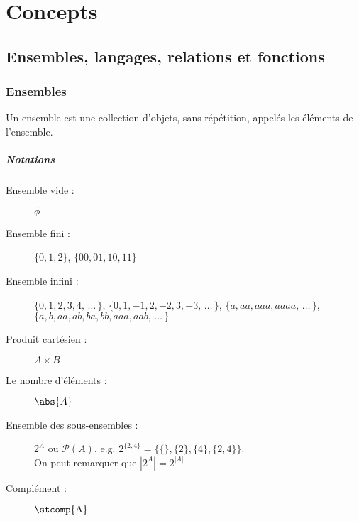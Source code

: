 
\chapter{Concepts}
\label{ch:concepts}

\section{Ensembles, langages, relations et fonctions}
\label{sec:ensembles_langages_relations_et_fonctions}

\subsection{Ensembles}
\label{subsec:ensembles}
Un ensemble est une collection d'objets, sans répétition, appelés les éléments
de l'ensemble.
\paragraph{Notations}

\begin{description}
	\item [Ensemble vide :] $\phi$
	\item [Ensemble fini :] $\{ 0, 1, 2\}$, $\{00, 01, 10, 11\}$
	\item [Ensemble infini :] $\{ 0, 1, 2, 3, 4,\, \ldots\,\}$, $\{0, 1, -1, 2, -2, 3, -3, \, \ldots\,\}$, 
	\subitem $\{a, aa, aaa, aaaa,\, \ldots\,\}$, $\{a, b, aa, ab, ba, bb, aaa, aab, \, \ldots\,\}$
	\item [Produit cartésien :] $A \times B$
    \item [Le nombre d'éléments :] $\abs{A}$
    \item [Ensemble des sous-ensembles :] $2^A$ ou $\mathcal{P}(A)$, e.g. $2^{\{2,4\}} = \{\{\}, \{2\}, \{4\}, \{2,4\}\}$. \\
      On peut remarquer que $|2^A| = 2^{|A|}$
	\item [Complément :] $\stcomp{\mathrm{A}}$
\end{description}


